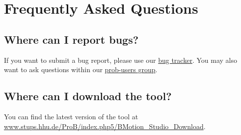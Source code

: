 \chapter{Frequently Asked Questions}
\label{faq}

\section{Where can I report bugs?}
\label{bugs}

If you want to submit a bug report, please use our \href{http://jira.cobra.cs.uni-duesseldorf.de/}{bug tracker}. 
You may also want to ask questions within our \href{https://groups.google.com/d/forum/prob-users}{prob-users group}.

\section{Where can I download the tool?}
\label{download}

You can find the latest version of the tool at \url{www.stups.hhu.de/ProB/index.php5/BMotion_Studio_Download}.

